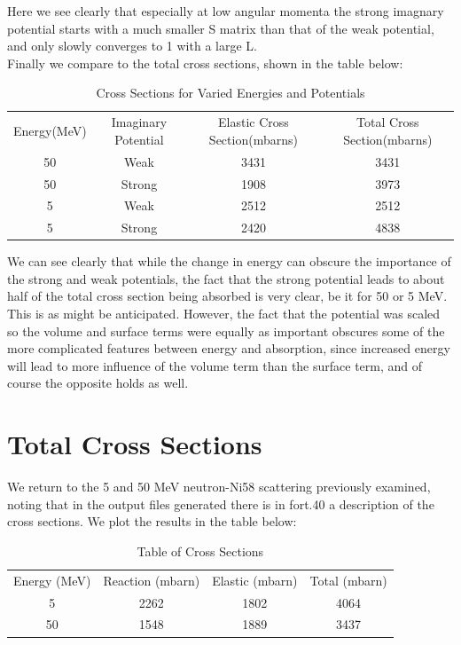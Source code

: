 \documentclass[paper=a4, fontsize=11pt]{scrartcl} %
\numberwithin{equation}{section} %
\numberwithin{figure}{section} %
\numberwithin{table}{section} %
\begin{document}
Here we see clearly that especially at low angular momenta the strong imagnary potential starts with a much smaller S matrix than that of the weak potential, and only slowly converges to 1 with a large L. \\

Finally we compare to the total cross sections, shown in the table below:\\
\begin{table}
\centering
\begin{tabular} {|c|c|c|c|}
Energy(MeV) & Imaginary Potential & Elastic Cross Section(mbarns) & Total Cross Section(mbarns)\\
50 & Weak & 3431 & 3431\\
50 & Strong & 1908 & 3973\\
5 & Weak & 2512 & 2512 \\
5 & Strong & 2420 & 4838 \end{tabular}\caption{Cross Sections for Varied Energies and Potentials}\end{table}

We can see clearly that while the change in energy can obscure the importance of the strong and weak potentials, the fact that the strong potential leads to about half of the total cross section being absorbed is very clear, be it for 50 or 5 MeV. This is as might be anticipated. However, the fact that the potential was scaled so the volume and surface terms were equally as important obscures some of the more complicated features between energy and absorption, since increased energy will lead to more influence of the volume term than the surface term, and of course the opposite holds as well.

\section{Total Cross Sections}

We return to the 5 and 50 MeV neutron-Ni58 scattering previously examined, noting that in the output files generated there is in fort.40 a description of the cross sections. We plot the results in the table below:\\

\begin{table}[hbt!]
\centering
\begin{tabular}{|c|c|c|c|}
Energy (MeV) & Reaction  (mbarn) & Elastic (mbarn)& Total (mbarn)\\
5 & 2262 & 1802 & 4064 \\
50 & 1548 &1889 & 3437 
\end{tabular}
\caption{Table of Cross Sections}
\end{table}
\end{document}
